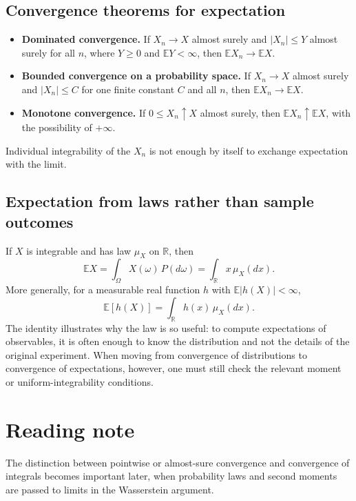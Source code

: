 \documentclass[10pt,a4paper]{article}
\newcommand{\R}{\mathbb R}\newcommand{\Q}{\mathbb Q}\newcommand{\E}{\mathbb E}\newcommand{\B}{\mathcal B}
\begin{document}
\subsection*{Convergence theorems for expectation}
\begin{itemize}[leftmargin=*]
\item \textbf{Dominated convergence.} If $X_n\to X$ almost surely and $|X_n|\le Y$ almost surely for all $n$, where $Y\ge0$ and $\E Y<\infty$, then $\E X_n\to\E X$.
\item \textbf{Bounded convergence on a probability space.} If $X_n\to X$ almost surely and $|X_n|\le C$ for one finite constant $C$ and all $n$, then $\E X_n\to\E X$.
\item \textbf{Monotone convergence.} If $0\le X_n\uparrow X$ almost surely, then $\E X_n\uparrow\E X$, with the possibility of $+\infty$.
\end{itemize}
Individual integrability of the $X_n$ is not enough by itself to exchange expectation with the limit.


\subsection*{Expectation from laws rather than sample outcomes}
If $X$ is integrable and has law $\mu_X$ on $\R$, then
\[
\E X=\int_{\Omega}X(\omega)\,P(d\omega)
=\int_{\R}x\,\mu_X(dx).
\]
More generally, for a measurable real function $h$ with $\E|h(X)|<\infty$,
\[
\E[h(X)]=\int_{\R}h(x)\,\mu_X(dx).
\]
The identity illustrates why the law is so useful: to compute expectations of observables, it is often enough to know the distribution and not the details of the original experiment. When moving from convergence of distributions to convergence of expectations, however, one must still check the relevant moment or uniform-integrability conditions.

\section*{Reading note}
The distinction between pointwise or almost-sure convergence and convergence of integrals becomes important later, when probability laws and second moments are passed to limits in the Wasserstein argument.
\end{document}
